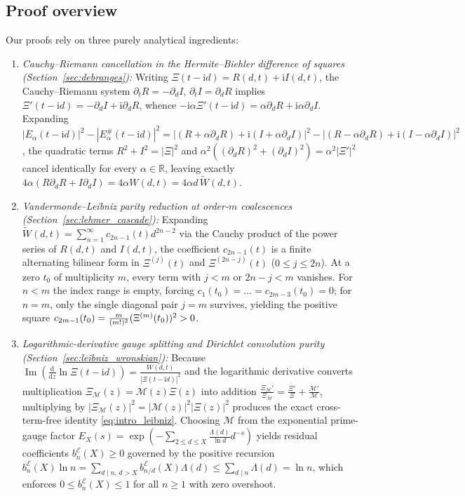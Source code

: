 \documentclass[11pt,reqno,a4paper]{amsart}
\theoremstyle{plain}
\theoremstyle{definition}
\theoremstyle{remark}
\numberwithin{equation}{section}
\newcommand{\fac}{\mathclose{\mathchar"0021}}
\newcommand{\dd}{\mathrm{d}}
\newcommand{\ii}{\mathrm{i}}
\begin{document}
\subsection{Proof overview}\label{subsec:proof_overview}
Our proofs rely on three purely analytical ingredients:
\begin{enumerate}[label=\textbf{\arabic*.},leftmargin=2.2em]
  \item \emph{Cauchy--Riemann cancellation in the Hermite--Biehler difference of squares (Section~\ref{sec:debranges}):} Writing $\Xi(t-\ii d) = R(d,t) + \ii I(d,t)$, the Cauchy--Riemann system $\partial_t R = -\partial_d I$, $\partial_t I = \partial_d R$ implies $\Xi'(t-\ii d) = -\partial_d I + \ii\partial_d R$, whence $-\ii\alpha\Xi'(t-\ii d) = \alpha\partial_d R + \ii\alpha\partial_d I$. Expanding $|E_\alpha(t-\ii d)|^2 - |E_\alpha^\#(t-\ii d)|^2 = |(R+\alpha\partial_d R)+\ii(I+\alpha\partial_d I)|^2 - |(R-\alpha\partial_d R)+\ii(I-\alpha\partial_d I)|^2$, the quadratic terms $R^2+I^2 = |\Xi|^2$ and $\alpha^2((\partial_d R)^2+(\partial_d I)^2) = \alpha^2|\Xi'|^2$ cancel identically for every $\alpha \in \mathbb{R}$, leaving exactly $4\alpha(R\partial_d R + I\partial_d I) = 4\alpha W(d,t) = 4\alpha d\,\widetilde{W}(d,t)$.
  \item \emph{Vandermonde--Leibniz parity reduction at order-$m$ coalescences (Section~\ref{sec:lehmer_cascade}):} Expanding $\widetilde{W}(d,t) = \sum_{n=1}^\infty c_{2n-1}(t)d^{2n-2}$ via the Cauchy product of the power series of $R(d,t)$ and $I(d,t)$, the coefficient $c_{2n-1}(t)$ is a finite alternating bilinear form in $\Xi^{(j)}(t)$ and $\Xi^{(2n-j)}(t)$ ($0 \le j \le 2n$). At a zero $t_0$ of multiplicity $m$, every term with $j < m$ or $2n-j < m$ vanishes. For $n < m$ the index range is empty, forcing $c_1(t_0) = \dots = c_{2m-3}(t_0) = 0$; for $n = m$, only the single diagonal pair $j = m$ survives, yielding the positive square $c_{2m-1}(t_0) = \frac{m}{(m\fac)^2}(\Xi^{(m)}(t_0))^2 > 0$.
  \item \emph{Logarithmic-derivative gauge splitting and Dirichlet convolution purity (Section~\ref{sec:leibniz_wronskian}):} Because $\operatorname{Im}(\frac{\dd}{\dd z}\ln\Xi(t-\ii d)) = \frac{W(d,t)}{|\Xi(t-\ii d)|^2}$ and the logarithmic derivative converts multiplication $\Xi_{\mathcal{M}}(z) = \mathcal{M}(z)\Xi(z)$ into addition $\frac{\Xi_{\mathcal{M}}'}{\Xi_{\mathcal{M}}} = \frac{\Xi'}{\Xi} + \frac{\mathcal{M}'}{\mathcal{M}}$, multiplying by $|\Xi_{\mathcal{M}}(z)|^2 = \allowbreak |\mathcal{M}(z)|^2|\Xi(z)|^2$ produces the exact cross-term-free identity \eqref{eq:intro_leibniz}. Choosing $\mathcal{M}$ from the exponential prime-gauge factor $E_X(s) = \allowbreak \exp(-\sum_{2 \le d \le X}\allowbreak\frac{\Lambda(d)}{\ln d}d^{-s})$ yields residual coefficients $b_n^{\mathcal{E}}(X) \ge 0$ governed by the positive recursion $b_n^{\mathcal{E}}(X)\ln n = \allowbreak \sum_{d\mid n,\,d>X}\allowbreak b_{n/d}^{\mathcal{E}}(X)\Lambda(d) \le \allowbreak \sum_{d\mid n}\Lambda(d) = \ln n$, which enforces $0 \le b_n^{\mathcal{E}}(X) \le 1$ for all $n \ge 1$ with zero overshoot.
\end{enumerate}
\end{document}
